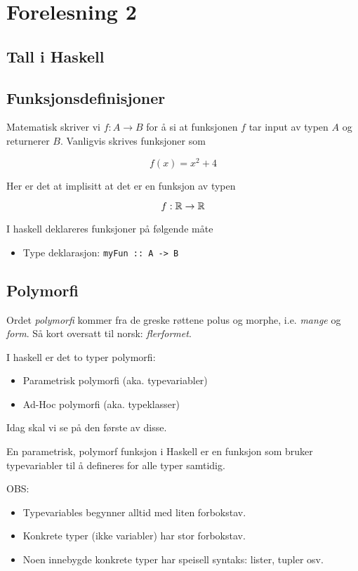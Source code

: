 \documentclass{article}
\begin{document}
    \section{Forelesning 2}

    \subsection{Tall i Haskell}
\subsection{Funksjonsdefinisjoner}

Matematisk skriver vi \( f: A \rightarrow B \) for å si at funksjonen \( f \) tar input av typen \( A \) og returnerer \( B \). Vanligvis skrives funksjoner som

\[ f\left( x \right) = x^2 + 4 \]

Her er det at implisitt at det er en funksjon av typen

\[ f: \mathbb{R} \rightarrow \mathbb{R} \]

I haskell deklareres funksjoner på følgende måte

\begin{itemize}
    \item Type deklarasjon: \texttt{myFun :: A -> B}
\end{itemize}


    \subsection{Polymorfi}

    Ordet \textit{polymorfi} kommer fra de greske røttene polus og morphe, i.e. \textit{mange} og \textit{form}. Så kort oversatt til norsk: \textit{flerformet}.
\bigskip

I haskell er det to typer polymorfi:

\begin{itemize}
    \item Parametrisk polymorfi (aka. typevariabler)
    \item Ad-Hoc polymorfi (aka. typeklasser)
\end{itemize}

Idag skal vi se på den første av disse.
\bigskip

En parametrisk, polymorf funksjon i Haskell er en funksjon som bruker typevariabler til å defineres for alle typer samtidig.

OBS:

\begin{itemize}
    \item Typevariables begynner alltid med liten forbokstav.
    \item Konkrete typer (ikke variabler) har stor forbokstav.
    \item Noen innebygde konkrete typer har speisell syntaks: lister, tupler osv.
\end{itemize}
\end{document}
